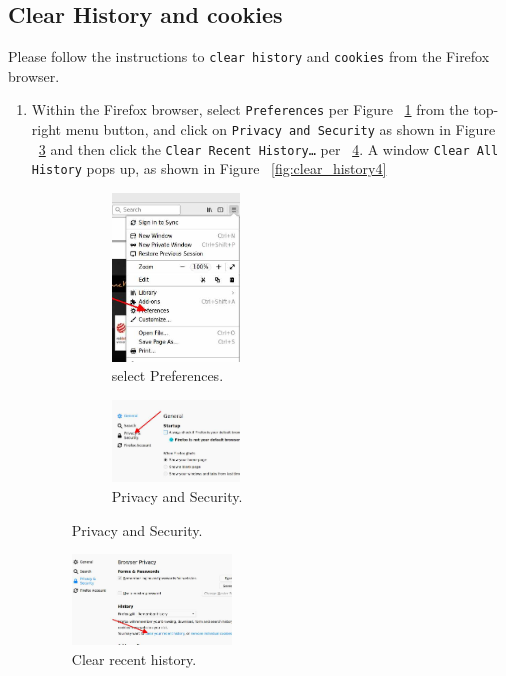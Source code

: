 \subsection{Clear History and cookies} 

Please follow the instructions to {\tt clear history} and {\tt cookies} from the Firefox browser.

\begin{enumerate}
  \item Within the Firefox browser, select {\tt Preferences} per Figure ~\ref{fig:clear_history1} from the top-right menu button, and click on {\tt Privacy and Security} as shown in Figure ~\ref{fig:clear_history2} 
and then click the
{\tt Clear Recent History…} per ~\ref{fig:clear_history3}. A window {\tt Clear All History} pops up, as shown in Figure ~\ref{fig:clear_history4}

	\begin{figure}
	\centering	
	\begin{subfigure}
	\centering	
	\includegraphics[width=0.4\textwidth,natwidth=621,natheight=403]{Figs/clearhistory1.jpg}
	\caption{select Preferences.} 
	\label{fig:clear_history1}
	\end{subfigure}%
	\begin{subfigure}
	\centering	
	\includegraphics[width=0.4\textwidth,natwidth=621,natheight=403]{Figs/clearhistory2.jpg}
	\caption{Privacy and Security.} 
	\label{fig:clear_history2}
	\end{subfigure}
	\end{figure}
	\begin{figure}[ht]
	\centering	
	\includegraphics[width=0.4\textwidth,natwidth=621,natheight=403]{Figs/clearhistory3.jpg}
	\caption{Clear recent history.} 
	\label{fig:clear_history3}
	\end{figure}


\end{enumerate}
